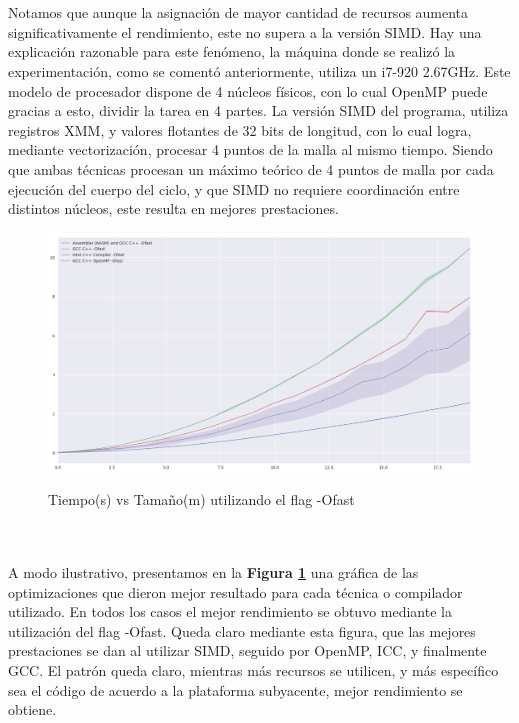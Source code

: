 ~\\
~\\
Notamos que aunque la asignación de mayor cantidad de recursos aumenta significativamente el rendimiento, este no supera a la versión SIMD. Hay una explicación razonable para este fenómeno, la máquina donde se realizó la experimentación, como se comentó anteriormente, utiliza un i7-920 2.67GHz. Este modelo de procesador dispone de 4 núcleos físicos, con lo cual OpenMP puede gracias a esto, dividir la tarea en 4 partes. La versión SIMD del programa, utiliza registros XMM, y valores flotantes de 32 bits de longitud, con lo cual logra, mediante vectorización, procesar 4 puntos de la malla al mismo tiempo. Siendo que ambas técnicas procesan un máximo teórico de 4 puntos de malla por cada ejecución del cuerpo del ciclo, y que SIMD no requiere coordinación entre distintos núcleos, este resulta en mejores prestaciones.

\begin{figure}[!htbp]
\caption{Tiempo(s) vs Tamaño(m) utilizando el flag -Ofast}
\includegraphics[width=\textwidth]{imagenes/plot_ofast.png}
\label{fig:plot_ofast}
\end{figure}
~\\
~\\

A modo ilustrativo, presentamos en la \textbf{Figura \ref{fig:plot_ofast}} una gráfica de las optimizaciones que dieron mejor resultado para cada técnica o compilador utilizado. En todos los casos el mejor rendimiento se obtuvo mediante la utilización del flag -Ofast. Queda claro mediante esta figura, que las mejores prestaciones se dan al utilizar SIMD, seguido por OpenMP, ICC, y finalmente GCC. El patrón queda claro, mientras más recursos se utilicen, y más específico sea el código de acuerdo a la plataforma subyacente, mejor rendimiento se obtiene. 




